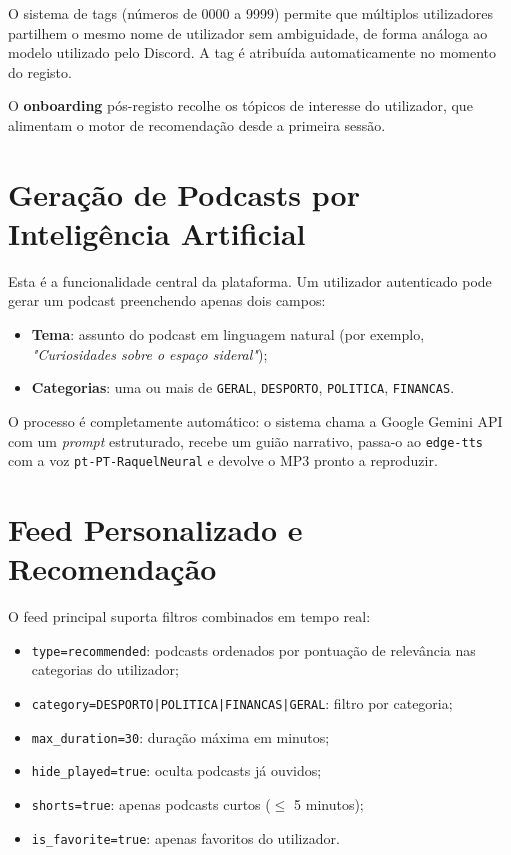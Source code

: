\documentclass[12pt, a4paper]{report}
\begin{document}
O sistema de tags (números de 0000 a 9999) permite que múltiplos utilizadores
partilhem o mesmo nome de utilizador sem ambiguidade, de forma análoga ao modelo
utilizado pelo Discord. A tag é atribuída automaticamente no momento do registo.

O \textbf{onboarding} pós-registo recolhe os tópicos de interesse do utilizador,
que alimentam o motor de recomendação desde a primeira sessão.

\section{Geração de Podcasts por Inteligência Artificial}

Esta é a funcionalidade central da plataforma. Um utilizador autenticado pode
gerar um podcast preenchendo apenas dois campos:

\begin{itemize}
  \item \textbf{Tema}: assunto do podcast em linguagem natural (por exemplo, \emph{"Curiosidades sobre o espaço sideral"});
  \item \textbf{Categorias}: uma ou mais de \texttt{GERAL}, \texttt{DESPORTO}, \texttt{POLITICA}, \texttt{FINANCAS}.
\end{itemize}

O processo é completamente automático: o sistema chama a Google Gemini API com
um \emph{prompt} estruturado, recebe um guião narrativo, passa-o ao
\texttt{edge-tts} com a voz \texttt{pt-PT-RaquelNeural} e devolve o MP3 pronto
a reproduzir.

\section{Feed Personalizado e Recomendação}

O feed principal suporta filtros combinados em tempo real:

\begin{itemize}
  \item \texttt{type=recommended}: podcasts ordenados por pontuação de relevância nas categorias do utilizador;
  \item \texttt{category=DESPORTO|POLITICA|FINANCAS|GERAL}: filtro por categoria;
  \item \texttt{max\_duration=30}: duração máxima em minutos;
  \item \texttt{hide\_played=true}: oculta podcasts já ouvidos;
  \item \texttt{shorts=true}: apenas podcasts curtos ($\leq$ 5 minutos);
  \item \texttt{is\_favorite=true}: apenas favoritos do utilizador.
\end{itemize}
\end{document}
